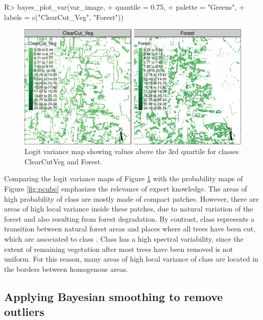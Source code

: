 \documentclass[
  shortnames]{jss}
\begin{document}
\begin{CodeChunk}
\begin{CodeInput}
R> bayes_plot_var(var_image, 
+                  quantile = 0.75, 
+                  palette = "Greens",
+                  labels = c("ClearCut_Veg", "Forest"))
\end{CodeInput}
\begin{figure}[h]

{\centering \includegraphics{Bayesian_smoothing_JSS_files/figure-latex/vcube-1} 

}

\caption[Logit variance map showing values above the 3rd quartile for classes ClearCutVeg and Forest]{Logit variance map showing values above the 3rd quartile for classes ClearCutVeg and Forest.}\label{fig:vcube}
\end{figure}
\end{CodeChunk}

Comparing the logit variance maps of Figure \ref{fig:vcube} with the probability maps of Figure \ref{fig:pcube} emphasizes the relevance of expert knowledge. The areas of high probability of class  are mostly made of compact patches. However, there are areas of high local variance inside these patches, due to natural variation of the forest and also resulting from forest degradation. By contrast, class  represents a transition between natural forest areas and places where all trees have been cut, which are associated to class . Class  has a high spectral variability, since the extent of remaining vegetation after most trees have been removed is not uniform. For this reason, many areas of high local variance of class  are located in the borders between homogenous areas.

\subsection{Applying Bayesian smoothing to remove outliers}\label{applying-bayesian-smoothing-to-remove-outliers}
\end{document}
